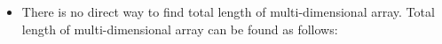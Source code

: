 \begin{flushleft}
\begin{itemize}
		\bigskip
		
		\item There is no direct way to find total length of multi-dimensional array. Total length of multi-dimensional array can be found as follows:
		
		
		
		
	\end{itemize}
	
	
	
	
	
\end{flushleft}
\newpage